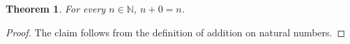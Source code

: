 \documentclass{article}
\newcommand{\N}{\mathbb{N}}
\newtheorem{theorem}{Theorem}
\begin{document}
\begin{theorem}\label{thm:add-zero}
For every $n \in \N$, $n + 0 = n$.
\end{theorem}
\begin{proof}
The claim follows from the definition of addition on natural numbers.
\end{proof}
\end{document}
